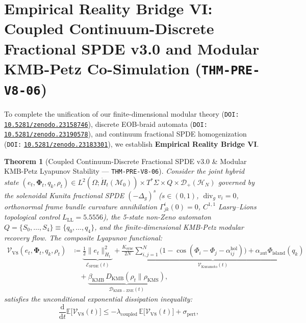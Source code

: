 \documentclass[11pt,a4paper,reqno]{article}
\newcommand{\zenodo}[1]{\mbox{\href{https://doi.org/10.5281/zenodo.#1}{\texttt{10.5281/zenodo.#1}}}}
\theoremstyle{plain}
\newtheorem{theorem}{Theorem}[section]
\theoremstyle{definition}
\theoremstyle{remark}
\numberwithin{equation}{section}
\begin{document}
\bigskip

\section{Empirical Reality Bridge VI: Coupled Continuum-Discrete Fractional SPDE v3.0 and Modular KMB-Petz Co-Simulation (\texttt{THM-PRE-V8-06})}
\label{sec:bridge6_coupled_spde_v30}

To complete the unification of our finite-dimensional modular theory (\texttt{DOI:} \zenodo{23158746}), discrete EOB-braid automata (\texttt{DOI:} \zenodo{23190578}), and continuum fractional SPDE homogenization (\texttt{DOI:} \zenodo{23183301}), we establish \textbf{Empirical Reality Bridge VI}.

\begin{theorem}[{Coupled Continuum-Discrete Fractional SPDE v3.0 \& Modular KMB-Petz Lyapunov Stability --- \texttt{THM-PRE-V8-06}}]
\label{thm:bridge6_coupled_v8}
Consider the joint hybrid state $(e_t, \bm{\Phi}_t, q_k, \rho_t) \in L^2(\Omega; \dot{H}_t(\mathcal{M}_0)) \times T^*\Sigma \times Q \times \mathcal{D}_+(\mathcal{H}_N)$ governed by the solenoidal Kunita fractional SPDE $(-\Delta_g)^s$ ($s \in (0,1)$, $\operatorname{div}_g v_i = 0$, orthonormal frame bundle curvature annihilation $\Gamma_{jk}^i(0) = 0$, $C^{1,1}$ Lasry--Lions topological control $L_{\mathrm{LL}} = 5.5556$), the 5-state non-Zeno automaton $Q = \{S_0,\dots,S_4\} \equiv \{q_0,\dots,q_4\}$, and the finite-dimensional KMB-Petz modular recovery flow. The composite Lyapunov functional:
\begin{equation}
\label{eq:v8_composite_lyapunov_finite}
\begin{aligned}
\mathcal{V}_{\mathrm{V8}}(e_t, \bm{\Phi}_t, q_k, \rho_t)
&\coloneqq \underbrace{\frac{1}{2}\lVert e_t \rVert_{\dot{H}_t}^2}_{\mathcal{E}_{\mathrm{SPDE}}(t)}
+ \underbrace{\frac{K_{\mathrm{sync}}}{2N}\sum_{i,j=1}^N \bigl(1 - \cos(\Phi_i - \Phi_j - \alpha_{ij}^{\mathrm{hol}})\bigr) + \alpha_{\mathrm{aut}}\Phi_{\mathrm{island}}(q_k)}_{\mathcal{V}_{\mathrm{Kuramoto}}(t)} \\
&\quad + \underbrace{\beta_{\mathrm{KMB}}\, D_{\mathrm{KMB}}(\rho_t \parallel \rho_{\mathrm{KMS}})}_{\mathcal{D}_{\mathrm{KMB-ZNE}}(t)},
\end{aligned}
\end{equation}
satisfies the unconditional exponential dissipation inequality:
\begin{equation}
\label{eq:v8_decay_inequality_finite}
\frac{\mathrm{d}}{\mathrm{d}t}\mathbb{E}\bigl[\mathcal{V}_{\mathrm{V8}}(t)\bigr] \le -\lambda_{\mathrm{coupled}}\,\mathbb{E}\bigl[\mathcal{V}_{\mathrm{V8}}(t)\bigr] + \sigma_{\mathrm{pert}}, \quad

\end{equation}
\end{theorem}
\end{document}
